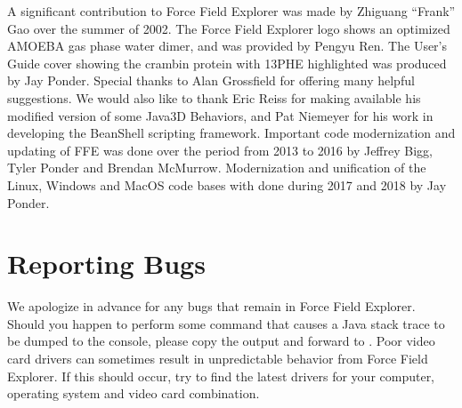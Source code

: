 \documentclass[letterpaper,11pt,english]{sphinxmanual}
\begin{document}
A significant contribution to Force Field Explorer was made by Zhiguang “Frank” Gao over the summer of 2002. The Force Field Explorer logo shows an optimized AMOEBA gas phase water dimer, and was provided by Pengyu Ren. The User’s Guide cover showing the crambin protein with 13\sphinxhyphen{}PHE highlighted was produced by Jay Ponder. Special thanks to Alan Grossfield for offering many helpful suggestions. We would also like to thank Eric Reiss for making available his modified version of some Java3D Behaviors, and Pat Niemeyer for his work in developing the BeanShell scripting framework. Important code modernization and updating of FFE was done over the period from 2013 to 2016 by Jeffrey Bigg, Tyler Ponder and Brendan McMurrow. Modernization and unification of the Linux, Windows and MacOS code bases with done during 2017 and 2018 by Jay Ponder.


\section{Reporting Bugs}
\label{\detokenize{text/acknowledgements:reporting-bugs}}
We apologize in advance for any bugs that remain in Force Field Explorer. Should you happen to perform some command that causes a Java stack trace to be dumped to the console, please copy the output and forward to . Poor video card drivers can sometimes result in unpredictable behavior from Force Field Explorer. If this should occur, try to find the latest drivers for your computer, operating system and video card combination.



\renewcommand{\indexname}{Index}
\printindex
\end{document}
